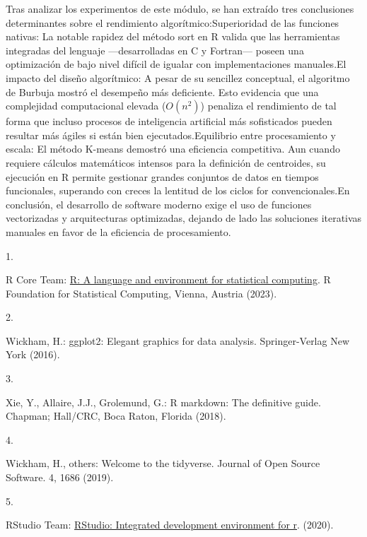 \documentclass[runningheads]{llncs}
\newlength{\cslhangindent}
\newlength{\csllabelwidth}
\newenvironment{CSLReferences}[2] %
 {\begin{list}{}{%
  \setlength{\itemindent}{0pt}
  \setlength{\leftmargin}{0pt}
  \setlength{\parsep}{0pt}
  \ifodd #1
   \setlength{\leftmargin}{\cslhangindent}
   \setlength{\itemindent}{-1\cslhangindent}
  \fi
  \setlength{\itemsep}{#2\baselineskip}}}
 {\end{list}}
\newcommand{\CSLLeftMargin}[1]{\parbox[t]{\csllabelwidth}{#1}}
\newcommand{\CSLRightInline}[1]{\parbox[t]{\linewidth - \csllabelwidth}{#1}\break}
\begin{document}
Tras analizar los experimentos de este módulo, se han extraído tres
conclusiones determinantes sobre el rendimiento algorítmico:Superioridad
de las funciones nativas: La notable rapidez del método sort en R valida
que las herramientas integradas del lenguaje ---desarrolladas en C y
Fortran--- poseen una optimización de bajo nivel difícil de igualar con
implementaciones manuales.El impacto del diseño algorítmico: A pesar de
su sencillez conceptual, el algoritmo de Burbuja mostró el desempeño más
deficiente. Esto evidencia que una complejidad computacional elevada
(\(O(n^2)\)) penaliza el rendimiento de tal forma que incluso procesos
de inteligencia artificial más sofisticados pueden resultar más ágiles
si están bien ejecutados.Equilibrio entre procesamiento y escala: El
método K-means demostró una eficiencia competitiva. Aun cuando requiere
cálculos matemáticos intensos para la definición de centroides, su
ejecución en R permite gestionar grandes conjuntos de datos en tiempos
funcionales, superando con creces la lentitud de los ciclos for
convencionales.En conclusión, el desarrollo de software moderno exige el
uso de funciones vectorizadas y arquitecturas optimizadas, dejando de
lado las soluciones iterativas manuales en favor de la eficiencia de
procesamiento.

\label{refs}
\begin{CSLReferences}{0}{0}
\CSLLeftMargin{1. }%
\CSLRightInline{R Core Team: \href{https://www.R-project.org/}{R: A
language and environment for statistical computing}. R Foundation for
Statistical Computing, Vienna, Austria (2023).}

\CSLLeftMargin{2. }%
\CSLRightInline{Wickham, H.: ggplot2: Elegant graphics for data
analysis. Springer-Verlag New York (2016).}

\CSLLeftMargin{3. }%
\CSLRightInline{Xie, Y., Allaire, J.J., Grolemund, G.: R markdown: The
definitive guide. Chapman; Hall/CRC, Boca Raton, Florida (2018).}

\CSLLeftMargin{4. }%
\CSLRightInline{Wickham, H., others: Welcome to the {tidyverse}. Journal
of Open Source Software. 4, 1686 (2019).}

\CSLLeftMargin{5. }%
\CSLRightInline{RStudio Team: \href{http://www.rstudio.com/}{RStudio:
Integrated development environment for r}. (2020).}

\end{CSLReferences}

%
\end{document}
